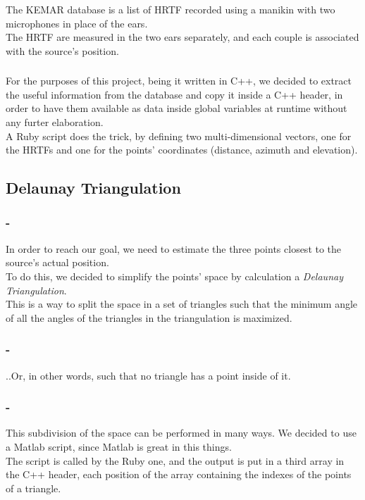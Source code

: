 \documentclass{beamer}
\begin{document}
	\begin{frame}
	\frametitle{\insertsection}
	The KEMAR database is a list of HRTF recorded using a manikin with two
	microphones in place of the ears.\\
	The HRTF are measured in the two ears separately, and each couple is
	associated with the source's position.\\
	\end{frame}

	\begin{frame}
	\frametitle{\insertsection}
	For the purposes of this project, being it written in C++, we decided to
	extract the useful information from the database and copy it inside a C++ header,
	in order to have them available as data inside global variables at runtime without
	any furter elaboration.\\
	A Ruby script does the trick, by defining two multi-dimensional vectors,
	one for the HRTFs and one for the points' coordinates (distance, azimuth and elevation).\\
	\end{frame}

	\subsection{Delaunay Triangulation}

	\begin{frame}
	\frametitle{\insertsection - \insertsubsection}
	In order to reach our goal, we need to estimate the three points closest to
	the source's actual position.\\
	To do this, we decided to simplify the points' space by calculation a {\em Delaunay
	Triangulation}.\\
	This is a way to split the space in a set of triangles such that the minimum angle
	of all the angles of the triangles in the triangulation is maximized.
	\end{frame}

	\begin{frame}
	\frametitle{\insertsection - \insertsubsection}
	..Or, in other words, such that no triangle has a point inside of it.
	\end{frame}

	\begin{frame}
	\frametitle{\insertsection - \insertsubsection}
	This subdivision of the space can be performed in many ways. We decided to use
	a Matlab script, since Matlab is great in this things.\\
	The script is called by the Ruby one, and the output is put in a third array in
	the C++ header, each position of the array containing the indexes of the points of
	a triangle.\\
	\end{frame}
\end{document}
